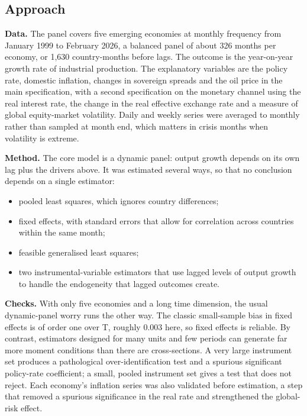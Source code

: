 \documentclass[
  british,
  a4paper,
]{article}
\providecommand{\tightlist}{%
  \setlength{\itemsep}{0pt}\setlength{\parskip}{0pt}}
\begin{document}
\subsection{Approach}\label{approach}

\textbf{Data.} The panel covers five emerging economies at monthly
frequency from January 1999 to February 2026, a balanced panel of about
326 months per economy, or 1,630 country-months before lags. The outcome
is the year-on-year growth rate of industrial production. The
explanatory variables are the policy rate, domestic inflation, changes
in sovereign spreads and the oil price in the main specification, with a
second specification on the monetary channel using the real interest
rate, the change in the real effective exchange rate and a measure of
global equity-market volatility. Daily and weekly series were averaged
to monthly rather than sampled at month end, which matters in crisis
months when volatility is extreme.

\textbf{Method.} The core model is a dynamic panel: output growth
depends on its own lag plus the drivers above. It was estimated several
ways, so that no conclusion depends on a single estimator:

\begin{itemize}
\tightlist
\item
  pooled least squares, which ignores country differences;
\item
  fixed effects, with standard errors that allow for correlation across
  countries within the same month;
\item
  feasible generalised least squares;
\item
  two instrumental-variable estimators that use lagged levels of output
  growth to handle the endogeneity that lagged outcomes create.
\end{itemize}

\textbf{Checks.} With only five economies and a long time dimension, the
usual dynamic-panel worry runs the other way. The classic small-sample
bias in fixed effects is of order one over T, roughly 0.003 here, so
fixed effects is reliable. By contrast, estimators designed for many
units and few periods can generate far more moment conditions than there
are cross-sections. A very large instrument set produces a pathological
over-identification test and a spurious significant policy-rate
coefficient; a small, pooled instrument set gives a test that does not
reject. Each economy's inflation series was also validated before
estimation, a step that removed a spurious significance in the real rate
and strengthened the global-risk effect.
\end{document}
